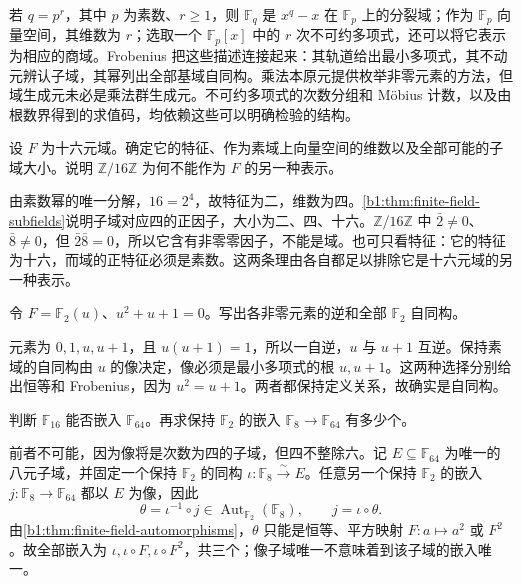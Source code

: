 




\begin{chaptersummary}
	若 \(q=p^r\)，其中 \(p\) 为素数、\(r\ge1\)，则 \(\mathbb F_q\) 是 \(x^q-x\) 在 \(\mathbb F_p\) 上的分裂域；作为 \(\mathbb F_p\) 向量空间，其维数为 \(r\)；选取一个 \(\mathbb F_p[x]\) 中的 \(r\) 次不可约多项式，还可以将它表示为相应的商域。Frobenius 把这些描述连接起来：其轨道给出最小多项式，其不动元辨认子域，其幂列出全部基域自同构。乘法本原元提供枚举非零元素的方法，但域生成元未必是乘法群生成元。不可约多项式的次数分组和 Möbius 计数，以及由根数界得到的求值码，均依赖这些可以明确检验的结构。
\end{chaptersummary}

\BookExercises

\begin{exercise}\label{b1:ex:17-cardinality}
	设 \(F\) 为十六元域。确定它的特征、作为素域上向量空间的维数以及全部可能的子域大小。说明 \(\mathbb Z/16\mathbb Z\) 为何不能作为 \(F\) 的另一种表示。
\end{exercise}
\begin{solution}
	由素数幂的唯一分解，\(16=2^4\)，故特征为二，维数为四。\cref{b1:thm:finite-field-subfields}说明子域对应四的正因子，大小为二、四、十六。\(\mathbb Z/16\mathbb Z\) 中 \(\bar2\ne0\)、\(\bar8\ne0\)，但 \(\bar2\bar8=0\)，所以它含有非零零因子，不能是域。也可只看特征：它的特征为十六，而域的正特征必须是素数。这两条理由各自都足以排除它是十六元域的另一种表示。
\end{solution}

\begin{exercise}\label{b1:ex:17-four-field}
	令 \(F=\mathbb F_2(u)\)、\(u^2+u+1=0\)。写出各非零元素的逆和全部 \(\mathbb F_2\) 自同构。
\end{exercise}
\begin{solution}
	元素为 \(0,1,u,u+1\)，且 \(u(u+1)=1\)，所以一自逆，\(u\) 与 \(u+1\) 互逆。保持素域的自同构由 \(u\) 的像决定，像必须是最小多项式的根 \(u,u+1\)。这两种选择分别给出恒等和 Frobenius，因为 \(u^2=u+1\)。两者都保持定义关系，故确实是自同构。
\end{solution}

\begin{exercise}\label{b1:ex:17-embedding-count}
	判断 \(\mathbb F_{16}\) 能否嵌入 \(\mathbb F_{64}\)。再求保持 \(\mathbb F_2\) 的嵌入 \(\mathbb F_8\rightarrow\mathbb F_{64}\) 有多少个。
\end{exercise}
\begin{solution}
	前者不可能，因为像将是次数为四的子域，但四不整除六。记 \(E\subseteq\mathbb F_{64}\) 为唯一的八元子域，并固定一个保持 \(\mathbb F_2\) 的同构 \(\iota:\mathbb F_8\xrightarrow{\sim}E\)。任意另一个保持 \(\mathbb F_2\) 的嵌入 \(j:\mathbb F_8\rightarrow\mathbb F_{64}\) 都以 \(E\) 为像，因此
	\[
		\theta=\iota^{-1}\circ j\in\operatorname{Aut}_{\mathbb F_2}(\mathbb F_8), \qquad j=\iota\circ\theta.
	\]
	由\cref{b1:thm:finite-field-automorphisms}，\(\theta\) 只能是恒等、平方映射 \(F:a\mapsto a^2\) 或 \(F^2\)。故全部嵌入为 \(\iota,\iota\circ F,\iota\circ F^2\)，共三个；像子域唯一不意味着到该子域的嵌入唯一。
\end{solution}

